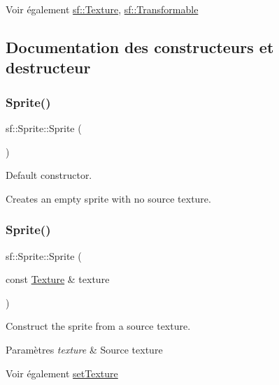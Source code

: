 \begin{DoxySeeAlso}{Voir également}
\hyperlink{classsf_1_1Texture}{sf\+::\+Texture}, \hyperlink{classsf_1_1Transformable}{sf\+::\+Transformable} 
\end{DoxySeeAlso}


\subsection{Documentation des constructeurs et destructeur}
\mbox{\label{classsf_1_1Sprite_a92559fbca895a96758abf5eabab96984}} 
\subsubsection{\texorpdfstring{Sprite()}{Sprite()}\hspace{0.1cm}{\footnotesize\ttfamily [1/3]}}
{\footnotesize\ttfamily sf\+::\+Sprite\+::\+Sprite (\begin{DoxyParamCaption}{ }\end{DoxyParamCaption})}



Default constructor. 

Creates an empty sprite with no source texture. \mbox{\label{classsf_1_1Sprite_a2a9fca374d7abf084bb1c143a879ff4a}} 
\subsubsection{\texorpdfstring{Sprite()}{Sprite()}\hspace{0.1cm}{\footnotesize\ttfamily [2/3]}}
{\footnotesize\ttfamily sf\+::\+Sprite\+::\+Sprite (\begin{DoxyParamCaption}\item[{const \hyperlink{classsf_1_1Texture}{Texture} \&}]{texture }\end{DoxyParamCaption})\hspace{0.3cm}{\ttfamily [explicit]}}



Construct the sprite from a source texture. 


\begin{DoxyParams}{Paramètres}
{\em texture} & Source texture\\
\hline
\end{DoxyParams}
\begin{DoxySeeAlso}{Voir également}
\hyperlink{classsf_1_1Sprite_a3729c88d88ac38c19317c18e87242560}{set\+Texture} 
\end{DoxySeeAlso}
\mbox{\label{classsf_1_1Sprite_a01cfe1402372d243dbaa2ffa96020206}} 
